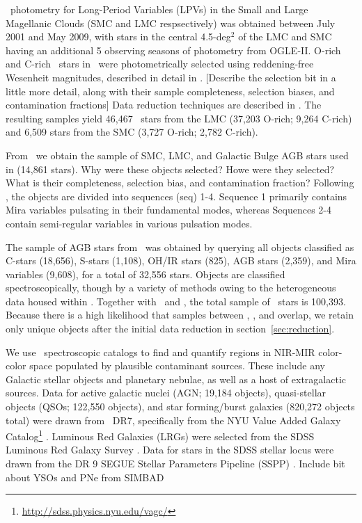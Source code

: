 \ogle\, photometry for Long-Period Variables (LPVs) in the Small and Large Magellanic Clouds (SMC and LMC respsectively) was obtained between July 2001 and May 2009, with stars in the central 4.5-deg$^2$ of the LMC and SMC having an additional 5 observing seasons of photometry from OGLE-II. O-rich and C-rich \agb\, stars in \ogle\, were photometrically selected using reddening-free Wesenheit magnitudes, described in detail in \cite{2009AcA....59..239S,2011AcA....61..217S}. {\color{red}[Describe the selection bit in a little more detail, along with their sample completeness, selection biases, and contamination fractions]} Data reduction techniques are described in \cite{2008AcA....58...69U}. The resulting samples yield 46,467 \agb\, stars from the LMC (37,203 O-rich; 9,264 C-rich) and 6,509 stars from the SMC (3,727 O-rich; 2,782 C-rich). 

From \macho\, we obtain the sample of SMC, LMC, and Galactic Bulge AGB stars used in \cite{2008AJ....136.1242F} (14,861 stars). {\color{red}Why were these objects selected? Howe were they selected? What is their completeness, selection bias, and contamination fraction?} Following \cite{2008AJ....136.1242F}, the objects are divided into sequences (seq) 1-4. Sequence 1 primarily contains Mira variables pulsating in their fundamental modes, whereas Sequences 2-4 contain semi-regular variables in various pulsation modes.

The sample of AGB stars from \simbad\, was obtained by querying all objects classified as C-stars (18,656), S-stars (1,108), OH/IR stars (825), AGB stars (2,359), and Mira variables (9,608), for a total of 32,556 stars. Objects are classified spectroscopically, though by a variety of methods owing to the heterogeneous data housed within \simbad. Together with \macho\, and \ogle, the total sample of \agb\, stars is 100,393. Because there is a high likelihood that samples between \ogle, \macho, and \simbad overlap, we retain only unique objects after the initial data reduction in section~\ref{sec:reduction}.

We use \sdss\, spectroscopic catalogs to find and quantify regions in NIR-MIR color-color space populated by plausible contaminant sources. These include any Galactic stellar objects and planetary nebulae, as well as a host of extragalactic sources. Data for active galactic nuclei (AGN; 19,184 objects), quasi-stellar objects (QSOs; 122,550 objects), and star forming/burst galaxies (820,272 objects total) were drawn from \sdss\, DR7, specifically from the NYU Value Added Galaxy Catalog\footnote{\url{http://sdss.physics.nyu.edu/vagc/}} \citep[VAGC]{2005AJ....129.2562B}. Luminous Red Galaxies (LRGs) were selected from the SDSS Luminous Red Galaxy Survey \citep[105,631 objects, ][]{2010ApJ...710.1444K}.  Data for stars in the SDSS stellar locus were drawn from the DR 9 SEGUE Stellar Parameters Pipeline (SSPP) \citep[1,843,190 objects, ][]{2012ApJS..203...21A}. {\color{red} Include bit about YSOs and PNe from SIMBAD}

